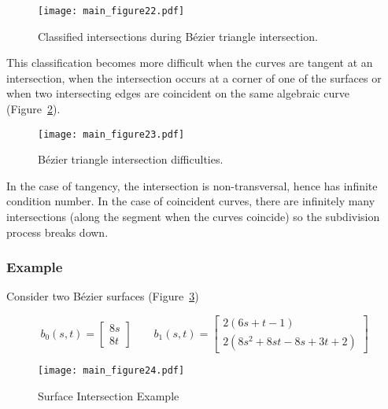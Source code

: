 \documentclass[letterpaper,10pt]{article}
\theoremstyle{definition}
\begin{document}
\begin{figure}
  \texttt{[image: main\_figure22.pdf]}
  \centering
  \captionsetup{width=.75\linewidth}
  \caption{Classified intersections during B\'{e}zier triangle intersection.}
  \label{fig:intersection-classification}
\end{figure}

This classification becomes more difficult when the curves
are tangent at an intersection, when the intersection occurs at a corner
of one of the surfaces or when two intersecting edges are coincident
on the same algebraic curve (Figure~\ref{fig:intersection-difficulties}).

\begin{figure}
  \texttt{[image: main\_figure23.pdf]}
  \centering
  \captionsetup{width=.75\linewidth}
  \caption{B\'{e}zier triangle intersection difficulties.}
  \label{fig:intersection-difficulties}
\end{figure}

In the case of tangency, the intersection is non-transversal, hence has
infinite condition number. In the case of coincident curves, there are
infinitely many intersections (along the segment when the curves
coincide) so the subdivision process breaks down.

\subsubsection{Example}

Consider two B\'{e}zier surfaces
(Figure~\ref{fig:surface-surface-example})

\begin{equation}
b_0(s, t) =
\left[ \begin{array}{c}
    8 s \\ 8 t \end{array}\right] \qquad
b_1(s, t) =
\left[ \begin{array}{c}
    2 (6 s + t - 1) \\
    2 (8 s^2 + 8 s t - 8 s + 3 t + 2) \end{array}\right]
\end{equation}
\begin{figure}
  \texttt{[image: main\_figure24.pdf]}
  \centering
  \captionsetup{width=.75\linewidth}
  \caption{Surface Intersection Example}
  \label{fig:surface-surface-example}
\end{figure}
\end{document}
